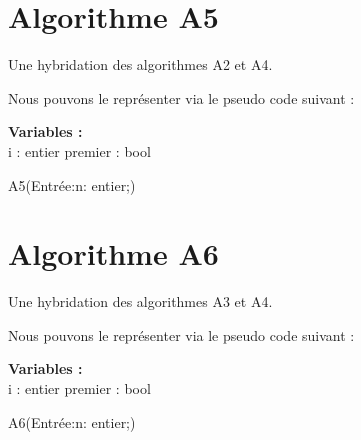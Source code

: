 \section{Algorithme A5}
 Une hybridation des algorithmes A2 et A4.
 \par
Nous pouvons le représenter via le pseudo code suivant :

\par
\begin{function}[H]
    \textbf{Variables :}\\
    i : entier\;
    premier : bool\;
    \caption{A5(Entrée:n: entier;)}
\end{function}
\newpage
\section{Algorithme A6}
 Une hybridation des algorithmes A3 et A4.
 \par
Nous pouvons le représenter via le pseudo code suivant :

\par
\begin{function}[H]
    \textbf{Variables :}\\
    i : entier\;
    premier : bool\;
    \caption{A6(Entrée:n: entier;)}
\end{function}

